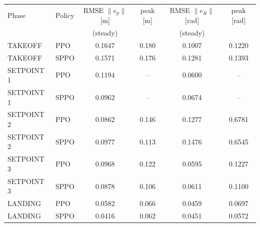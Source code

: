\begin{tabular}{llcccc}
\toprule
Phase & Policy & RMSE $\|e_p\|$ [m] & peak [m] & RMSE $\|e_R\|$ [rad] & peak [rad] \\
 & & (steady) & & (steady) & \\
\midrule
TAKEOFF & PPO & 0.1647 & 0.180 & 0.1007 & 0.1220 \\
TAKEOFF & SPPO & 0.1571 & 0.176 & 0.1281 & 0.1393 \\
\midrule
SETPOINT 1 & PPO & 0.1194 & -- & 0.0600 & -- \\
SETPOINT 1 & SPPO & 0.0962 & -- & 0.0674 & -- \\
\midrule
SETPOINT 2 & PPO & 0.0862 & 0.146 & 0.1277 & 0.6781 \\
SETPOINT 2 & SPPO & 0.0977 & 0.113 & 0.1476 & 0.6545 \\
\midrule
SETPOINT 3 & PPO & 0.0968 & 0.122 & 0.0595 & 0.1227 \\
SETPOINT 3 & SPPO & 0.0878 & 0.106 & 0.0611 & 0.1100 \\
\midrule
LANDING & PPO & 0.0582 & 0.066 & 0.0459 & 0.0697 \\
LANDING & SPPO & 0.0416 & 0.062 & 0.0451 & 0.0572 \\
\bottomrule
\end{tabular}
